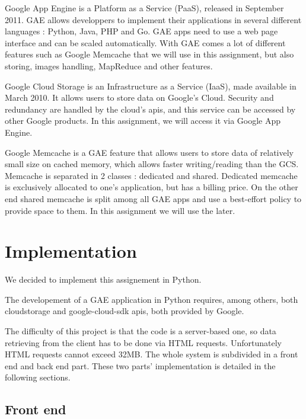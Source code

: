 \documentclass{article}
\begin{document}
Google App Engine is a Platform as a Service (PaaS), released in September 2011. GAE allows developpers to implement their applications in several different languages : Python, Java, PHP and Go. GAE apps need to use a web page interface and can be scaled automatically. With GAE comes a lot of different features such as Google Memcache that we will use in this assignment, but also storing, images handling, MapReduce and other features.



Google Cloud Storage is an Infrastructure as a Service (IaaS), made available in March 2010. It allows users to store data on Google's Cloud. Security and redundancy are handled by the cloud's apis, and this service can be accessed by other Google products. In this assignment, we will access it via Google App Engine.



Google Memcache is a GAE feature that allows users to store data of relatively small size on cached memory, which allows faster writing/reading than the GCS. Memcache is separated in 2 classes : dedicated and shared. Dedicated memcache is exclusively allocated to one's application, but has a billing price. On the other end shared memcache is split among all GAE apps and use a best-effort policy to provide space to them. In this assignment we will use the later.



\section{Implementation}

We decided to implement this assignement in Python.



The developement of a GAE application in Python requires, among others, both cloudstorage and google-cloud-sdk apis, both provided by Google.



The difficulty of this project is that the code is a server-based one, so data retrieving from the client has to be done via HTML requests. Unfortunately HTML requests cannot exceed 32MB. The whole system is subdivided in a front end and back end part. These two parts' implementation is detailed in the following sections.

 

\subsection{Front end}
\end{document}
